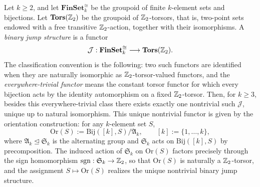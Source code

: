 \begin{theorem}\label{thm:bdry-z2-jump-functor-uniqueness}
Let \(k\ge 2\), and let \(\mathbf{FinSet}_k^{\cong}\) be the groupoid of finite \(k\)-element sets and bijections.
Let \(\mathbf{Tors}(\mathbb{Z}_2)\) be the groupoid of \(\mathbb{Z}_2\)-torsors, that is, two-point sets endowed with a free transitive \(\mathbb{Z}_2\)-action, together with their isomorphisms.
A \emph{binary jump structure} is a functor
\[
\mathcal J:\mathbf{FinSet}_k^{\cong}\longrightarrow \mathbf{Tors}(\mathbb{Z}_2).
\]
The classification convention is the following: two such functors are identified when they are naturally isomorphic as \(\mathbb{Z}_2\)-torsor-valued functors, and the \emph{everywhere-trivial functor} means the constant torsor functor for which every bijection acts by the identity automorphism on a fixed \(\mathbb{Z}_2\)-torsor.
Then, for \(k\ge 3\), besides this everywhere-trivial class there exists exactly one nontrivial such \(\mathcal J\), unique up to natural isomorphism.
This unique nontrivial functor is given by the orientation construction: for any \(k\)-element set \(S\),
\[
\mathrm{Or}(S):=\mathrm{Bij}([k],S)\big/\mathfrak{A}_k,
\qquad [k]:=\{1,\dots,k\},
\]
where \(\mathfrak{A}_k\trianglelefteq\mathfrak{S}_k\) is the alternating group and \(\mathfrak{S}_k\) acts on \(\mathrm{Bij}([k],S)\) by precomposition.
The induced action of \(\mathfrak{S}_k\) on \(\mathrm{Or}(S)\) factors precisely through the sign homomorphism \(\operatorname{sgn}:\mathfrak{S}_k\to \mathbb{Z}_2\), so that \(\mathrm{Or}(S)\) is naturally a \(\mathbb{Z}_2\)-torsor, and the assignment \(S\mapsto \mathrm{Or}(S)\) realizes the unique nontrivial binary jump structure.
\end{theorem}

